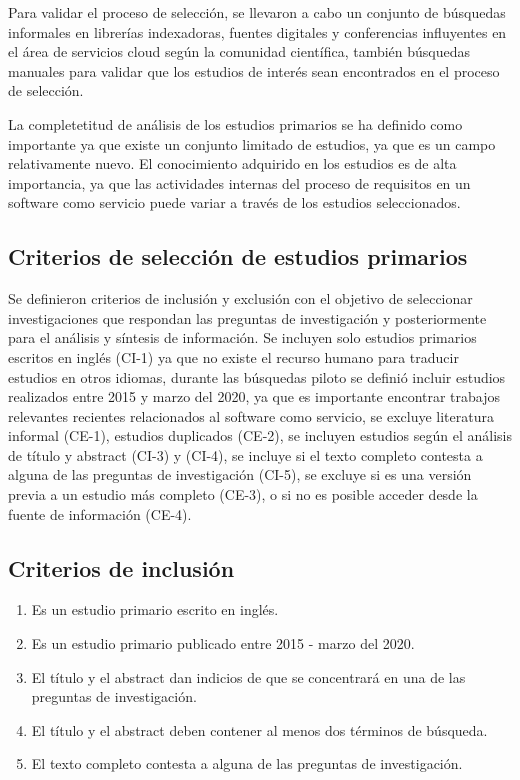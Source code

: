 \documentclass{article}
\begin{document}
Para validar el proceso de selección, se llevaron a cabo un conjunto de búsquedas 
informales en librerías indexadoras, fuentes digitales y conferencias influyentes en el área de 
servicios cloud según la comunidad científica, también búsquedas manuales para validar que los 
estudios de interés sean encontrados en el proceso de selección.

La completetitud de análisis de los estudios primarios se ha definido como importante ya que 
existe un conjunto limitado de estudios, ya que es un campo relativamente nuevo. 
El conocimiento adquirido en los estudios es de alta importancia, ya que las actividades 
internas del proceso de requisitos en  un software como servicio puede variar a través de los estudios
seleccionados.



\subsection{Criterios de selección de estudios primarios}
Se definieron criterios de inclusión y exclusión con el objetivo 
de seleccionar investigaciones que respondan las preguntas de investigación y posteriormente 
para el análisis y síntesis de información.
Se incluyen solo estudios primarios escritos en inglés (CI-1) ya que no existe el
recurso humano para traducir estudios en otros idiomas, durante las búsquedas piloto 
se definió incluir estudios realizados entre 2015 y marzo del 2020, ya que es importante
encontrar trabajos relevantes recientes relacionados al software como servicio, 
se excluye literatura informal (CE-1), estudios duplicados (CE-2), se incluyen 
estudios según el análisis de título y abstract (CI-3) y (CI-4),
se incluye si el texto completo contesta a alguna de las preguntas de investigación (CI-5), 
se excluye si es una versión previa a un estudio más completo (CE-3), o si no es posible acceder desde la fuente 
de información (CE-4).


\subsection{Criterios de inclusión}
\begin{enumerate}[C-1.-]
  \item{Es un estudio primario escrito en inglés.}
  \item{Es un estudio primario publicado entre 2015 - marzo del 2020.}
  \item{El título y el abstract dan indicios de que se concentrará en una de las preguntas de investigación.}
  \item{El título y el abstract deben contener al menos dos términos de búsqueda.}
  \item{El texto completo contesta a alguna de las preguntas de investigación.}
\end{enumerate}
\end{document}
